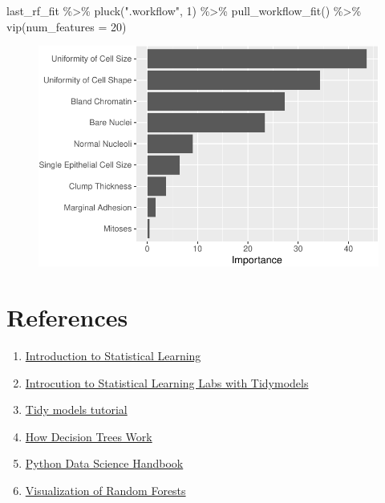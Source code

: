 \documentclass[
  letterpaper,
  DIV=11,
  numbers=noendperiod]{scrreprt}
\newenvironment{Shaded}{\begin{snugshade}}{\end{snugshade}}
\newcommand{\AttributeTok}[1]{\textcolor[rgb]{0.40,0.45,0.13}{#1}}
\newcommand{\DecValTok}[1]{\textcolor[rgb]{0.68,0.00,0.00}{#1}}
\newcommand{\FunctionTok}[1]{\textcolor[rgb]{0.28,0.35,0.67}{#1}}
\newcommand{\NormalTok}[1]{\textcolor[rgb]{0.00,0.23,0.31}{#1}}
\newcommand{\SpecialCharTok}[1]{\textcolor[rgb]{0.37,0.37,0.37}{#1}}
\newcommand{\StringTok}[1]{\textcolor[rgb]{0.13,0.47,0.30}{#1}}
\begin{document}
\begin{Shaded}
\begin{Highlighting}[]
\NormalTok{last\_rf\_fit }\SpecialCharTok{\%\textgreater{}\%} 
  \FunctionTok{pluck}\NormalTok{(}\StringTok{".workflow"}\NormalTok{, }\DecValTok{1}\NormalTok{) }\SpecialCharTok{\%\textgreater{}\%}   
  \FunctionTok{pull\_workflow\_fit}\NormalTok{() }\SpecialCharTok{\%\textgreater{}\%} 
  \FunctionTok{vip}\NormalTok{(}\AttributeTok{num\_features =} \DecValTok{20}\NormalTok{)}
\end{Highlighting}
\end{Shaded}

\begin{figure}[H]

{\centering \includegraphics{./14-machine-learning_files/figure-pdf/unnamed-chunk-23-1.pdf}

}

\end{figure}

\hypertarget{references-2}{%
\section{References}\label{references-2}}

\begin{enumerate}
\def\labelenumi{\arabic{enumi}.}
\item
  \href{https://www.statlearning.com/}{Introduction to Statistical
  Learning}
\item
  \href{https://emilhvitfeldt.github.io/ISLR-tidymodels-labs/}{Introcution
  to Statistical Learning Labs with Tidymodels}
\item
  \href{https://www.tidymodels.org/start/case-study/}{Tidy models
  tutorial}
\item
  \href{https://dataaspirant.com/how-decision-tree-algorithm-works/}{How
  Decision Trees Work}
\item
  \href{https://jakevdp.github.io/PythonDataScienceHandbook/05.08-random-forests.html}{Python
  Data Science Handbook}
\item
  \href{https://towardsdatascience.com/rfviz-an-interactive-visualization-package-for-random-forests-in-r-8fb71709c8bf}{Visualization
  of Random Forests}
\end{enumerate}
\end{document}
